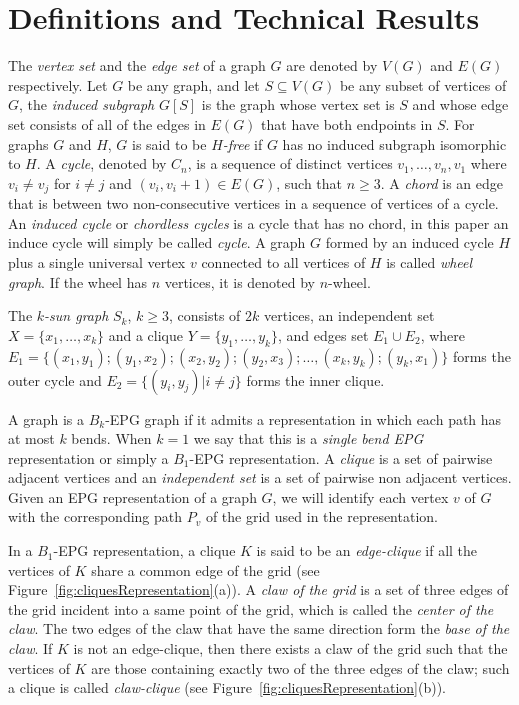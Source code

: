 \documentclass[9pt]{entcs}
\begin{document}
\section{Definitions and Technical Results}

The \textit{vertex set} and the \textit{edge set} of a graph $G$ are denoted by $V(G)$ and $E(G)$ respectively. 
Let $G$ be any graph, and let $S \subseteq V(G)$ be any subset of vertices of $G$, the \textit{induced subgraph} $G[S]$ is the graph whose vertex set is $S$ and whose edge set consists of all of the edges in $E(G)$ that have both endpoints in $S$.
 For graphs $G$ and $H$, $G$ is said to be \textit{$H$-free} if $G$ has no induced subgraph isomorphic to $H$. A \textit{cycle},  denoted by $C_n$,  is a sequence of distinct
vertices $v_1, \dots , v_n, v_1$  where $v_i \neq v_j$ for $i \neq j$ and $(v_i, v_i + 1) \in E(G)$, such that
$n \geq 3$. A \textit{chord} is an edge that is between two non-consecutive vertices in a sequence of vertices of a cycle. An \textit{induced cycle}  or \textit{chordless cycles} is a cycle that has no chord, in this paper an induce cycle will simply be called  \textit{cycle}. A graph $G$ formed by an induced cycle $H$ plus  a single universal vertex $v$ connected to all vertices of $H$
is called \textit{wheel graph}. If the wheel has $n$ vertices, it is denoted by $n$-wheel. 

The $k$\textit{-sun graph }$S_k$, $k \geq 3$, consists of
$2k$ vertices, an independent set $X = \{x_1, \dots, x_k\}$ and a clique $Y = \{y_1, \dots, y_k\}$, and edges set $E_1 \cup E_2$, where $E_ 1=\{ (x_1,y_1); (y_1, x_2); (x_2, y_2); (y_2, x_3); \dots , (x_k, y_k); (y_k, x_1) \}$ forms the outer cycle and $E_2= \{(y_i, y_j) |i\neq j\}$ forms the inner clique.

A graph is a $ B_k$-EPG graph if it admits a representation in which each path has at most $k$ bends.  When $ k = 1 $ we say that this is a \emph{single bend EPG} representation or simply a $B_1$-EPG representation.
A \textit{clique} is a set of pairwise adjacent vertices and
an \textit{independent set} is a set of pairwise non adjacent vertices.
Given an EPG representation of a graph $G$, we will identify each vertex $v$ of $G$ with the corresponding path $P_{v}$ of the grid used in the representation. 

In  a $B_1$-EPG representation, a clique $K$  is said to be
 an \textit{edge-clique} if all the vertices of $K$ share a common edge of the grid (see Figure~\ref{fig:cliquesRepresentation}(a)).
 A \textit{claw of the grid} is a set of three edges of the grid incident into a same point of the grid, which is called
  the \textit{center of the claw}. The two edges of the claw that have the same direction form
    the \textit{ base of the claw}. If $K$ is not an edge-clique, then there exists
    a claw of the grid such that the vertices of $K$ are those containing exactly two of the three edges of the claw; such a  clique is called  \textit{claw-clique} \cite{golumbic2009} (see Figure~\ref{fig:cliquesRepresentation}(b)).%
    
\end{document}
